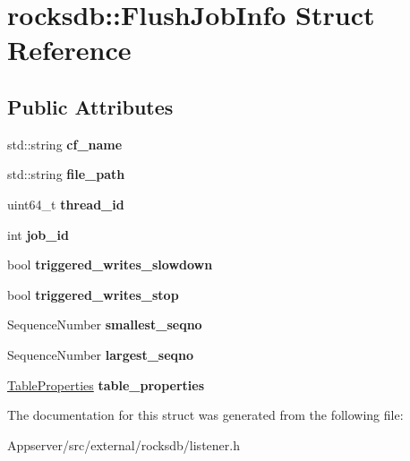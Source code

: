 \hypertarget{structrocksdb_1_1FlushJobInfo}{}\section{rocksdb\+:\+:Flush\+Job\+Info Struct Reference}
\label{structrocksdb_1_1FlushJobInfo}
\subsection*{Public Attributes}
\begin{DoxyCompactItemize}
\item 
std\+::string {\bfseries cf\+\_\+name}\hypertarget{structrocksdb_1_1FlushJobInfo_a924aca33916d216cdd3067503421b5c1}{}\label{structrocksdb_1_1FlushJobInfo_a924aca33916d216cdd3067503421b5c1}

\item 
std\+::string {\bfseries file\+\_\+path}\hypertarget{structrocksdb_1_1FlushJobInfo_a716b549513aa5fa49fd34ddc27d5ba28}{}\label{structrocksdb_1_1FlushJobInfo_a716b549513aa5fa49fd34ddc27d5ba28}

\item 
uint64\+\_\+t {\bfseries thread\+\_\+id}\hypertarget{structrocksdb_1_1FlushJobInfo_a165c4e1d14f6c0a3b6eb6f424dd5ab90}{}\label{structrocksdb_1_1FlushJobInfo_a165c4e1d14f6c0a3b6eb6f424dd5ab90}

\item 
int {\bfseries job\+\_\+id}\hypertarget{structrocksdb_1_1FlushJobInfo_aeaf78225922ab9cc0fb8a92013268ca9}{}\label{structrocksdb_1_1FlushJobInfo_aeaf78225922ab9cc0fb8a92013268ca9}

\item 
bool {\bfseries triggered\+\_\+writes\+\_\+slowdown}\hypertarget{structrocksdb_1_1FlushJobInfo_a22e452c6d1789f67ce0c4bf6fae8d0dd}{}\label{structrocksdb_1_1FlushJobInfo_a22e452c6d1789f67ce0c4bf6fae8d0dd}

\item 
bool {\bfseries triggered\+\_\+writes\+\_\+stop}\hypertarget{structrocksdb_1_1FlushJobInfo_a3d67070cf51b0121f738f0fca9b477a4}{}\label{structrocksdb_1_1FlushJobInfo_a3d67070cf51b0121f738f0fca9b477a4}

\item 
Sequence\+Number {\bfseries smallest\+\_\+seqno}\hypertarget{structrocksdb_1_1FlushJobInfo_a5a18e8dda289e2d23fd86944d422a8fc}{}\label{structrocksdb_1_1FlushJobInfo_a5a18e8dda289e2d23fd86944d422a8fc}

\item 
Sequence\+Number {\bfseries largest\+\_\+seqno}\hypertarget{structrocksdb_1_1FlushJobInfo_a2383fd356aa550a3db4def8ee3e9a2b6}{}\label{structrocksdb_1_1FlushJobInfo_a2383fd356aa550a3db4def8ee3e9a2b6}

\item 
\hyperlink{structrocksdb_1_1TableProperties}{Table\+Properties} {\bfseries table\+\_\+properties}\hypertarget{structrocksdb_1_1FlushJobInfo_a0ca795765af7fb79bdf9400fd6009b05}{}\label{structrocksdb_1_1FlushJobInfo_a0ca795765af7fb79bdf9400fd6009b05}

\end{DoxyCompactItemize}


The documentation for this struct was generated from the following file\+:\begin{DoxyCompactItemize}
\item 
Appserver/src/external/rocksdb/listener.\+h\end{DoxyCompactItemize}
